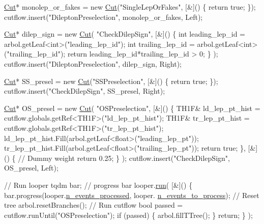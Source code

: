 \begin{DoxyEnumerate}
\begin{DoxyCode}
    \hyperlink{classCut}{Cut}* monolep\_or\_fakes = \textcolor{keyword}{new} \hyperlink{classCut}{Cut}(\textcolor{stringliteral}{"SingleLepOrFakes"}, [&]() \{ \textcolor{keywordflow}{return} \textcolor{keyword}{true}; \});
    cutflow.insert(\textcolor{stringliteral}{"DileptonPreselection"}, monolep\_or\_fakes, Left);

    \hyperlink{classCut}{Cut}* dilep\_sign = \textcolor{keyword}{new} \hyperlink{classCut}{Cut}(
        \textcolor{stringliteral}{"CheckDilepSign"},
        [&]()
        \{
            \textcolor{keywordtype}{int} leading\_lep\_id = arbol.getLeaf<\textcolor{keywordtype}{int}>(\textcolor{stringliteral}{"leading\_lep\_id"});
            \textcolor{keywordtype}{int} trailing\_lep\_id = arbol.getLeaf<\textcolor{keywordtype}{int}>(\textcolor{stringliteral}{"trailing\_lep\_id"});
            \textcolor{keywordflow}{return} leading\_lep\_id*trailing\_lep\_id > 0;
        \}
    );
    cutflow.insert(\textcolor{stringliteral}{"DileptonPreselection"}, dilep\_sign, Right);

    \hyperlink{classCut}{Cut}* SS\_presel = \textcolor{keyword}{new} \hyperlink{classCut}{Cut}(\textcolor{stringliteral}{"SSPreselection"}, [&]() \{ \textcolor{keywordflow}{return} \textcolor{keyword}{true}; \});
    cutflow.insert(\textcolor{stringliteral}{"CheckDilepSign"}, SS\_presel, Right);

    \hyperlink{classCut}{Cut}* OS\_presel = \textcolor{keyword}{new} \hyperlink{classCut}{Cut}(
        \textcolor{stringliteral}{"OSPreselection"}, 
        [&]() 
        \{ 
            TH1F& ld\_lep\_pt\_hist = cutflow.globals.getRef<TH1F>(\textcolor{stringliteral}{"ld\_lep\_pt\_hist"});
            TH1F& tr\_lep\_pt\_hist = cutflow.globals.getRef<TH1F>(\textcolor{stringliteral}{"tr\_lep\_pt\_hist"});
            ld\_lep\_pt\_hist.Fill(arbol.getLeaf<\textcolor{keywordtype}{float}>(\textcolor{stringliteral}{"leading\_lep\_pt"}));
            tr\_lep\_pt\_hist.Fill(arbol.getLeaf<\textcolor{keywordtype}{float}>(\textcolor{stringliteral}{"trailing\_lep\_pt"}));
            \textcolor{keywordflow}{return} \textcolor{keyword}{true}; 
        \},
        [&]()
        \{
            \textcolor{comment}{// Dummy weight}
            \textcolor{keywordflow}{return} 0.25;
        \}
    );
    cutflow.insert(\textcolor{stringliteral}{"CheckDilepSign"}, OS\_presel, Left);

    \textcolor{comment}{// Run looper}
    tqdm bar; \textcolor{comment}{// progress bar}
    looper.\hyperlink{classLooper_abfa564ca48778da1f58c8a6444ddd463}{run}(
        [&]() 
        \{
            bar.progress(looper.\hyperlink{classLooper_a97e473848469359cd33cd23771e0eb28}{n\_events\_processed}, looper.
      \hyperlink{classLooper_a666747cb782bd6082452a6d5ac18f94f}{n\_events\_to\_process});
            \textcolor{comment}{// Reset tree}
            arbol.resetBranches();
            \textcolor{comment}{// Run cutflow}
            \textcolor{keywordtype}{bool} passed = cutflow.runUntil(\textcolor{stringliteral}{"OSPreselection"});
            \textcolor{keywordflow}{if} (passed) \{ arbol.fillTTree(); \}
            \textcolor{keywordflow}{return};
        \}
    );


\end{DoxyCode}
\end{DoxyEnumerate}

